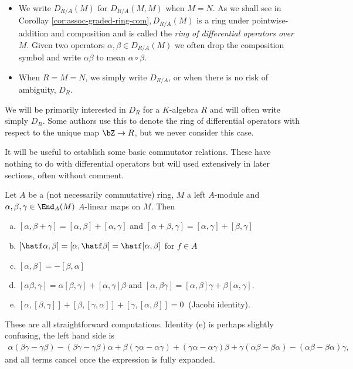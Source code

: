 \begin{notate}$ $
	\begin{itemize}
		\item We write $D_{R/A}(M)$ for $D_{R/A}(M,M)$ when $M = N$. As we shall see in Corollay \ref{cor:assoc-graded-ring-com}$, D_{R/A}(M)$ is a ring under pointwise-addition and composition and is called the \emph{ring of differential operators over $M$}. Given two operators $\alpha,\beta \in D_{R/A}(M)$ we often drop the composition symbol and write $\alpha\beta$ to mean $\alpha\circ \beta$.
		\item When $R = M = N$, we simply write $D_{R/A}$, or when there is no risk of ambiguity, $D_R$. 
	\end{itemize}
\end{notate}
\noindent We will be primarily interested in $D_{R}$ for a $K$-algebra $R$ and will often write simply $D_R$. Some authors use this to denote the ring of differential operators with respect to the unique map $\bZ\to R$, but we never consider this case.

It will be useful to establish some basic commutator relations. These have nothing to do with differential operators but will used extensively in later sections, often without comment.

\begin{prop}\label{prop:commutator-relations}
	Let $A$ be a (not necessarily commutative) ring, $M$ a left $A$-module and $\alpha,\beta,\gamma \in \End_A(M)$ $A$-linear maps on $M$. Then
	\begin{enumerate}[(a)]
		\item $[\alpha,\beta + \gamma] = [\alpha,\beta] + [\alpha, \gamma]$ and $[\alpha + \beta, \gamma] = [\alpha, \gamma] + [\beta,\gamma]$
		\item $[\hatf\alpha,\beta] = [\alpha,\hatf\beta] = \hatf[\alpha,\beta]$ for $f \in A$
		\item $[\alpha,\beta] = -[\beta,\alpha]$
		\item $[\alpha\beta,\gamma] = \alpha[\beta,\gamma] + [\alpha,\gamma]\beta$ and $[\alpha,\beta\gamma] = [\alpha,\beta]\gamma + \beta[\alpha,\gamma]$.
		\item $[\alpha,[\beta,\gamma]] + [\beta,[\gamma,\alpha]] + [\gamma,[\alpha,\beta]] = 0~$ \hspace{0.5em}(Jacobi identity).
	\end{enumerate}
\end{prop}
\begin{prf}
	These are all straightforward computations. Identity (e) is perhaps slightly confusing, the left hand side is
	\begin{align*}
		\alpha(\beta\gamma - \gamma\beta) - (\beta\gamma - \gamma\beta)\alpha + \beta(\gamma\alpha - \alpha\gamma) + (\gamma\alpha - \alpha\gamma)\beta + \gamma(\alpha\beta - \beta\alpha) - (\alpha\beta-\beta\alpha)\gamma,
	\end{align*}
	and all terms cancel once the expression is fully expanded.
\end{prf}

